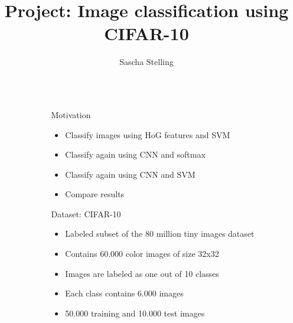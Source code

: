 \documentclass[final]{beamer}
\title{Project: Image classification using CIFAR-10}
\author{Sascha Stelling}
\newlength{\sepwid}
\newlength{\onecolwid}
\begin{document}
	


\setlength{\belowcaptionskip}{2ex} %
\setlength\belowdisplayshortskip{2ex} %


\begin{frame} %

\begin{columns} %

\begin{column}{\sepwid}\end{column} %

\begin{column}{\onecolwid} %

\begin{alertblock}{Motivation}
\begin{itemize}
	\item Classify images using HoG features and SVM
	\item Classify again using CNN and softmax
	\item Classify again using CNN and SVM
	\item Compare results
\end{itemize}

\end{alertblock}



\begin{block}{Dataset: CIFAR-10}
	\begin{itemize}
		\item Labeled subset of the 80 million tiny images dataset
		\item Contains 60.000 color images of size 32x32
		\item Images are labeled as one out of 10 classes
		\item Each class contains 6.000 images
		\item 50.000 training and 10.000 test images
	\end{itemize}
\end{block}


\end{column}
\end{columns}
\end{frame}
\end{document}
